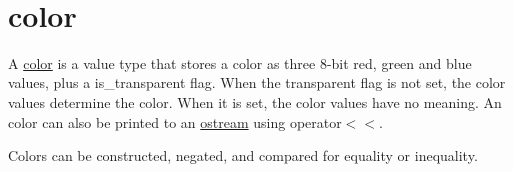 ~\newline
 

\hypertarget{graphics_color}{}\section{color}\label{graphics_color}
A \hyperlink{classhwlib_1_1color}{color} is a value type that stores a color as three 8-\/bit red, green and blue values, plus a \textquotesingle{}is\+\_\+transparent\textquotesingle{} flag. When the transparent flag is not set, the color values determine the color. When it is set, the color values have no meaning. An color can also be printed to an \hyperlink{classhwlib_1_1ostream}{ostream} using operator$<$$<$.

Colors can be constructed, negated, and compared for equality or inequality.

